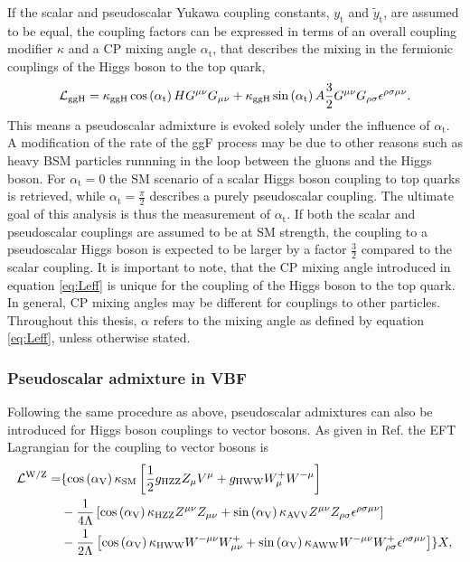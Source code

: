 If the scalar and pseudoscalar Yukawa coupling constants, $y_\text{t}$ and $\tilde{y}_\text{t}$, are assumed to be equal, the coupling factors can be expressed in terms of an overall coupling modifier $\kappa$ and a CP mixing angle $\alpha_\text{t}$, that describes the mixing in the fermionic couplings of the Higgs boson to the top quark,
\begin{equation}\label{eq:Leff}
    \mathcal{L}_\text{ggH} =  \kappa_\text{ggH}\,\text{cos}\left( \alpha_\text{t}\right) HG^{\mu\nu}G_{\mu\nu} + \kappa_\text{ggH}\,\text{sin}\left( \alpha_\text{t}\right) A \frac{3}{2} G^{\mu\nu}G_{\rho\sigma}\epsilon^{\rho\sigma\mu\nu}.
\end{equation}
This means a pseudoscalar admixture is evoked solely under the influence of $\alpha_\text{t}$. A modification of the rate of the ggF process may be due to other reasons such as heavy BSM particles runnning in the loop between the gluons and the Higgs boson.
For $\alpha_\text{t}=0$ the SM scenario of a scalar Higgs boson coupling to top quarks is retrieved, while $\alpha_\text{t}=\frac{\pi}{2}$ describes a purely pseudoscalar coupling.   
The ultimate goal of this analysis is thus the measurement of $\alpha_\text{t}$.
If both the scalar and pseudoscalar couplings are assumed to be at SM strength, the coupling to a pseudoscalar Higgs boson is expected to 
be larger by a factor $\frac{\text{3}}{\text{2}}$ compared to the scalar coupling.
It is important to note, that the CP mixing angle introduced in equation \eqref{eq:Leff} is unique for the coupling of the Higgs boson to the top quark. In general, CP mixing angles may be different 
for couplings to other particles. Throughout this thesis, $\alpha$ refers to the mixing angle as defined by equation \eqref{eq:Leff}, unless otherwise stated.

\subsubsection{Pseudoscalar admixture in VBF}\label{TH:VBF}

Following the same procedure as above, pseudoscalar admixtures can also be introduced for Higgs boson couplings to vector bosons.
As given in Ref. \cite{Artoisenet2013,Demartin:2014fia} the EFT Lagrangian for the coupling to vector bosons is 
\begin{align}
    \mathcal{L}^\text{W/Z} =& \{ \text{cos} \left( \alpha_\text{V} \right) \kappa_\text{SM}  \left[ \frac{1}{2}g_\text{HZZ}Z_\mu V^\mu +g_\text{HWW}W^+_\mu W^{-\mu} \right]  \\
                            &- \frac{1}{4\Lambda} \left[ \text{cos} \left( \alpha_\text{V} \right) \kappa_\text{HZZ} Z^{\mu\nu}Z_{\mu\nu} +\text{sin} \left( \alpha_\text{V} \right) \kappa_\text{AVV} Z^{\mu\nu}Z_{\rho\sigma} \epsilon^{\rho\sigma\mu\nu} \right]  \\
                            &- \frac{1}{2\Lambda} \left[ \text{cos} \left( \alpha_\text{V} \right) \kappa_\text{HWW} W^{-\mu\nu}W^+_{\mu\nu} +\text{sin} \left( \alpha_\text{V} \right) \kappa_\text{AWW}  W^{-\mu\nu}W^+_{\rho\sigma}\epsilon^{\rho\sigma\mu\nu} \right]  \} X, 
\end{align}

